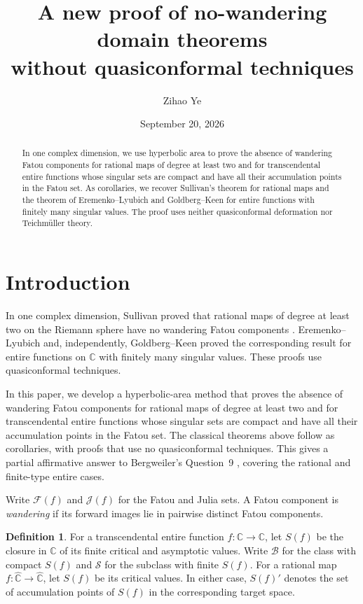 \documentclass[11pt,reqno]{amsart}
\title[A new proof of no-wandering domain theorems without quasiconformal techniques]{A new proof of no-wandering domain theorems\\
without quasiconformal techniques}
\author{Zihao Ye}   %
\date{September 20, 2026}
\newcommand{\C}{\mathbb C}
\newcommand{\sphere}{\widehat{\mathbb C}}
\newcommand{\Fat}{\mathcal F}
\newcommand{\Jul}{\mathcal J}
\theoremstyle{definition}
\newtheorem{definition}[theorem]{Definition}
\numberwithin{equation}{section}
\begin{document}
\begin{abstract}
In one complex dimension, we use hyperbolic area to prove the absence
of wandering Fatou components for rational maps of degree at least two
and for transcendental entire functions whose singular sets are compact
and have all their accumulation points in the Fatou set. As corollaries, we recover
Sullivan's theorem for rational maps and the theorem of
Eremenko--Lyubich and Goldberg--Keen for entire functions with finitely
many singular values. The proof uses neither quasiconformal deformation
nor Teichm\"uller theory.
\end{abstract}
\maketitle

\section{Introduction}

In one complex dimension, Sullivan proved that rational maps of degree
at least two on the Riemann sphere have no wandering Fatou components
\cite{Sullivan}. Eremenko--Lyubich \cite[Theorem~3]{EL} and,
independently, Goldberg--Keen \cite[Theorem~4.2]{GoldbergKeen} proved
the corresponding result for entire functions on $\C$ with finitely many
singular values.
These proofs use quasiconformal techniques.

In this paper, we develop a hyperbolic-area method that proves the
absence of wandering Fatou components for rational maps of degree at
least two and for transcendental entire functions whose singular sets
are compact and have all their accumulation points in the Fatou set.
The classical theorems above follow as corollaries, with proofs that
use no quasiconformal techniques. This gives a partial affirmative
answer to Bergweiler's Question~9 \cite[Section~4.6]{Bergweiler},
covering the rational and finite-type entire cases.

Write $\Fat(f)$ and $\Jul(f)$ for the Fatou and Julia sets. A Fatou
component is \emph{wandering} if its forward images lie in pairwise
distinct Fatou components.

\begin{definition}\label{def:singular}
For a transcendental entire function $f:\C\to\C$, let $S(f)$ be the closure in
$\C$ of its finite critical and asymptotic values.
Write $\mathcal B$ for the class with
compact $S(f)$ and $\mathcal S$ for the subclass with finite $S(f)$.
For a rational map $f:\sphere\to\sphere$, let $S(f)$ be its critical values.
In either case, $S(f)'$ denotes the set of accumulation points of $S(f)$
in the corresponding target space.
\end{definition}
\end{document}
